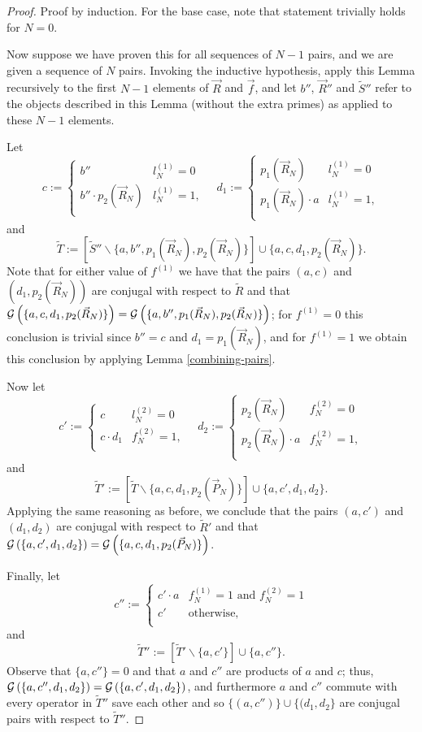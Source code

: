 \documentclass[twocolumn,showpacs,preprintnumbers,amsmath,amssymb,nofootinbib,pra,floatfix]{revtex4-1}
\newcommand{\lst}{\vec}
\newcommand{\set}{\tilde}
\newcommand{\genfun}{\mathcal{G}}
\begin{document}
\begin{proof}
Proof by induction.  For the base case, note that statement trivially holds for $N=0$.

Now suppose we have proven this for all sequences of $N-1$ pairs, and we are given a sequence of $N$ pairs.  Invoking the inductive hypothesis, apply this Lemma recursively to the first $N-1$ elements of $\lst R$ and $\lst f$, and let $b''$, $\lst R''$ and $\set S''$ refer to the objects described in this Lemma (without the extra primes) as applied to these $N-1$ elements.

Let
$$
c := 
\begin{cases}
b'' & l^{(1)}_N = 0\\
b'' \cdot p_2(\lst R_N)  &  l^{(1)}_N = 1,\\
\end{cases}
\quad
d_1 :=
\begin{cases}
p_1(\lst R_N) & l^{(1)}_N = 0\\
p_1(\lst R_N) \cdot a &  l^{(1)}_N = 1,\\
\end{cases}
$$
and
$$\set T := \left[\set S''\backslash\{a,b'',p_1(\lst R_N),p_2(\lst R_N)\}\right]\cup \{a,c,d_1,p_2(\lst R_N)\}.$$
Note that for either value of $f^{(1)}$ we have that the pairs $(a,c)$ and $(d_1,p_2(\lst R_N))$ are conjugal with respect to $\set R$ and that $\genfun\paren{\{a,c,d_1,p_2(\lst R_N)\}}=\genfun\paren{\{a,b'',p_1(\lst R_N),p_2(\lst R_N)\}}$; for $f^{(1)}=0$ this conclusion is trivial since $b''=c$ and $d_1=p_1(\lst R_N)$, and for $f^{(1)}=1$ we obtain this conclusion by applying Lemma \ref{combining-pairs}.

Now let
$$
c' := 
\begin{cases}
c & l^{(2)}_N = 0\\
c \cdot d_1  &  f^{(2)}_N = 1,\\
\end{cases}
\quad
d_2 :=
\begin{cases}
p_2(\lst R_N) & f^{(2)}_N = 0\\
p_2(\lst R_N) \cdot a &  f^{(2)}_N = 1,\\
\end{cases}
$$
and
$$\set T' := \left[\set T\backslash\{a,c,d_1,p_2(\lst P_N)\}\right]\cup \{a,c',d_1,d_2\}.$$
Applying the same reasoning as before, we conclude that the pairs $(a,c')$ and $(d_1,d_2)$ are conjugal with respect to $\set R'$ and that $\genfun\paren{\{a,c',d_1,d_2\}}=\genfun\paren{\{a,c,d_1,p_2(\lst P_N)\}}$.

Finally, let
$$c'' :=
\begin{cases}
c' \cdot a & f^{(1)}_N = 1 \,\,\text{and}\,\, f^{(2)}_N = 1 \\
c' & \text{otherwise},\\
\end{cases}
$$
and
$$
\set T'':=
\left[\set T'\backslash\{a,c'\}\right]\cup \{a,c''\}.
$$
Observe that $\{a,c''\}=0$ and that $a$ and $c''$ are products of $a$ and $c$;  thus, $\genfun\paren{\{a,c'',d_1,d_2\}}=\genfun\paren{\{a,c',d_1,d_2\}}$, and furthermore $a$ and $c''$ commute with every operator in $\set T''$ save each other and so $\{(a,c'')\} \cup \{(d_1,d_2\}$ are conjugal pairs with respect to $\set T''$.


\end{proof}
\end{document}
